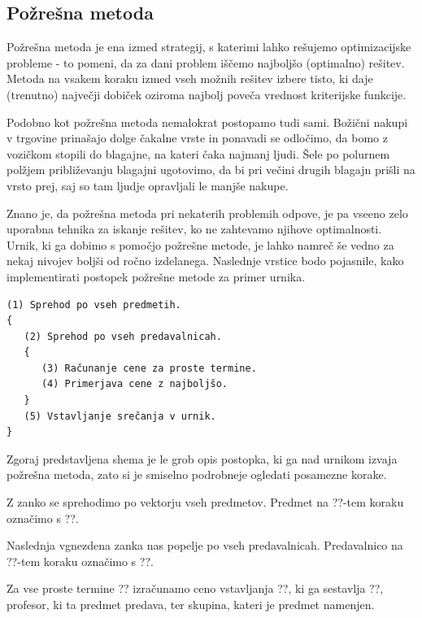 \documentclass[10pt,a4paper]{article}
\begin{document}
\subsection{Požrešna metoda}

Požrešna metoda je ena izmed strategij, s katerimi lahko rešujemo optimizacijske probleme -
to pomeni, da za dani problem iščemo najboljšo (optimalno) rešitev. Metoda na vsakem koraku
izmed vseh možnih rešitev izbere  tisto, ki daje (trenutno) največji dobiček oziroma najbolj
poveča vrednost kriterijske funkcije.

Podobno kot požrešna metoda nemalokrat postopamo tudi sami. Božični nakupi v trgovine
prinašajo dolge čakalne vrste in ponavadi se odločimo, da bomo z vozičkom stopili do blagajne,
na kateri čaka najmanj ljudi. Šele po polurnem polžjem približevanju blagajni ugotovimo,
da bi pri večini drugih blagajn prišli na vrsto prej, saj so tam ljudje opravljali le
manjše nakupe.

Znano je, da požrešna metoda pri nekaterih problemih odpove, je pa vseeno zelo uporabna
tehnika za iskanje rešitev, ko ne zahtevamo njihove optimalnosti. Urnik, ki ga dobimo s
pomočjo požrešne metode, je lahko namreč še vedno za nekaj nivojev boljši od ročno izdelanega.
Naslednje vrstice bodo pojasnile, kako implementirati postopek požrešne metode za primer urnika.

\begin{verbatim}
(1) Sprehod po vseh predmetih.
{
   (2) Sprehod po vseh predavalnicah.
   {
      (3) Računanje cene za proste termine.
      (4) Primerjava cene z najboljšo.
   }
   (5) Vstavljanje srečanja v urnik.
}
\end{verbatim}

\noindent
Zgoraj predstavljena shema je le grob opis postopka, ki ga nad urnikom izvaja požrešna metoda,
zato si je smiselno podrobneje ogledati posamezne korake.

   Z zanko se sprehodimo po vektorju vseh predmetov. Predmet na ??-tem koraku
   označimo s ??.

   Naslednja vgnezdena zanka nas popelje po vseh predavalnicah. Predavalnico na
   ??-tem koraku označimo s ??.

   Za vse proste termine ?? izračunamo ceno vstavljanja
   ??, ki ga sestavlja ??, profesor, ki ta predmet predava,
   ter skupina, kateri je predmet namenjen.
\end{document}
